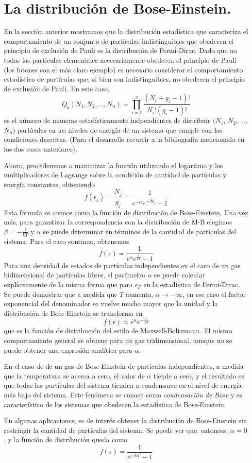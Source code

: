 \documentclass[12pt,a4paper]{article}
\def\e{{\epsilon}} %
\begin{document}
\section{La distribución de Bose-Einstein.}

En la sección anterior mostramos que la distribución estadística que caracteriza el comportamiento de un conjunto de partículas indistinguibles que obedecen el principio de exclusión de Pauli es la distribución de Fermi-Dirac. Dado que no todas las partículas elementales necesariamente obedecen el principio de Pauli (los fotones son el más claro ejemplo) es necesario considerar el comportamiento estadístico de partículas que, si bien son indistinguibles, no obedecen el principio de exclusión de Pauli. En este caso,
\[ Q_{b}(N_{1},N_{2},\ldots,N_{n})=\prod _{i=1}^{n} \frac{(N_{i}+g_{i}-1)!}{N_{i}!(g_{i}-1)!} \]
es el número de maneras estadísticamente indpendientes de distribuir $(N_{1}$, $N_{2}$, $\ldots$, $N_{n})$ partículas en los niveles de energía de un sistema que cumple con las condiciones descritas. (Para el desarrollo recurrir a la bibliografía mencionada en los dos casos anteriores).

Ahora, procederemos a maximizar la función utilizando el logaritmo y los multiplicadores de Lagrange sobre la condición de cantidad de partículas y energía constantes, obteniendo
\[ f(\e_{j})=\frac{N_{j}}{g_{j}}=\frac{1}{e^{-\alpha}e^{-\beta \e_{j}}-1} \]
Esta fórmula se conoce como la función de distribución de Bose-Einstein. Una vez más, para garantizar la correspondencia con la distribución de M-B elegimos $\beta=-\frac{1}{kT}$ y $\alpha$ se puede determinar en términos de la cantidad de partículas del sistema. Para el caso continuo, obtenemos
\[ f(\e)=\frac{1}{e^{\alpha}e^{\frac{\e}{kT}}-1} \]
Para una densidad de estados de partículas independientes en el caso de un gas bidimensional de partículas libres, el parámetro $\alpha$ se puede calcular explícitamente de la misma forma que para $\e_{F}$ en la estadística de Fermi-Dirac. Se puede demostrar que a medida que $T$ aumenta, $\alpha \rightarrow -\infty$, en ese caso el factor exponencial del denominador se vuelve mucho mayor que la unidad y la distribución de Bose-Einstein se transforma en
\[ f(\e) \approx e^{\alpha}e^{-\frac{\e}{kT}} \]
que es la función de distribución del estilo de Maxwell-Boltzmann. El mismo comportamiento general se obtiene para un gas tridimensional, aunque no se puede obtener una expresión analítica para $\alpha$.

En el caso de de un gas de Bose-Einstein de partículas independientes, a medida que la temperatura se acerca a cero, el valor de $\alpha$ tiende a cero, y el resultado es que todas las partículas del sistema tienden a condensarse en el nivel de energía más bajo del sistema. Este fenómeno se conoce como \emph{condensación de Bose} y es característico de los sistemas que obedecen la estadística de Bose-Einstein.

En algunas aplicaciones, es de interés obtener la distribución de Bose-Einstein sin restringir la cantidad de partículas del sistema. Se puede ver que, entonces, $\alpha=0$, y la función de distribución queda como
\[ f( \e)=\frac{1}{e^{\e/kT}-1} \]
\end{document}
